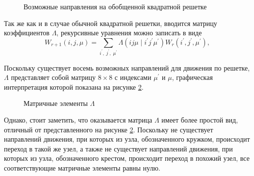 \documentclass[utf8,12pt]{jetp}
\begin{document}
\begin{figure}[h]
	\caption{Возможные направления на обобщенной квадратной решетке}
	\label{dirgen}
\end{figure}

Так же как и в случае обычной квадратной решетки, вводится матрицу коэффициентов $\Lambda$, рекурсивные уравнения можно записать в виде
\begin{equation}
W_{r+1}(i, j, \mu) = \sum_{i^{'},\; j^{'},\; \mu^{'}} \Lambda (ij\mu\; |\; i^{'}j^{'}\mu^{'}) W_{r} (i^{'}, j^{'}, \mu^{'}),
\end{equation}

Поскольку существует восемь возможных направлений для движения по решетке, $\Lambda$ представляет собой матрицу $8 \times 8$ с индексами $\mu^{'}$ и $\mu$, графическая интерпретация которой показана на рисунке \ref{matxgen}. 

\begin{figure}[h]
	\caption{Матричные элементы $\Lambda$}
	\label{matxgen}
\end{figure}

Однако, стоит заметить, что оказывается матрица $\Lambda$ имеет более простой вид, отличный от представленного на рисунке  \ref{matxgen}. Поскольку не существует направлений движения, при которых из узла, обозначенного кружком, происходит переход в такой же узел, а также не существует направлений движения, при которых из узла, обозначенного крестом, происходит переход в похожий узел, все соответствующие матричные элементы равны нулю.
\end{document}
